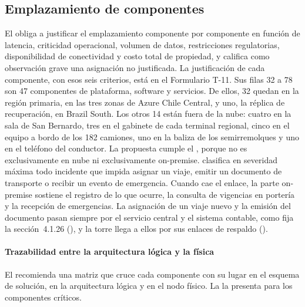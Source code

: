 \subsection{Emplazamiento de componentes}\label{sec:4-emplazamiento}

El  obliga a justificar el emplazamiento componente por componente en función de
latencia, criticidad operacional, volumen de datos, restricciones regulatorias, disponibilidad de
conectividad y costo total de propiedad, y califica como observación grave una asignación no
justificada. La justificación de cada componente, con esos seis criterios, está en el Formulario T-11. Sus filas
32 a 78 son 47 componentes de plataforma, software y servicios. De ellos, 32 quedan en la región
primaria, en las tres zonas de Azure Chile Central, y uno, la réplica de recuperación, en Brazil South.
Los otros 14 están fuera de la nube: cuatro en la sala de San
Bernardo, tres en el gabinete de cada terminal regional, cinco en el equipo a bordo de los 182 camiones,
uno en la baliza de los semirremolques y uno en el teléfono del conductor. La propuesta cumple el
, porque no es exclusivamente en nube ni exclusivamente on-premise. 
clasifica en severidad máxima todo incidente que impida asignar un viaje, emitir un documento de
transporte o recibir un evento de emergencia. Cuando cae el enlace, la parte on-premise sostiene el
registro de lo que ocurre, la consulta de vigencias en portería y la recepción de emergencias. La
asignación de un viaje nuevo y la emisión del documento pasan siempre por el servicio central y el
sistema contable, como fija la sección~4.1.26 (), y la torre llega a
ellos por sus enlaces de respaldo ().

\paragraph{Trazabilidad entre la arquitectura lógica y la física} El 
recomienda una matriz que cruce cada componente con su lugar en el esquema de solución, en la
arquitectura lógica y en el nodo físico. La  la presenta para los componentes
críticos.

